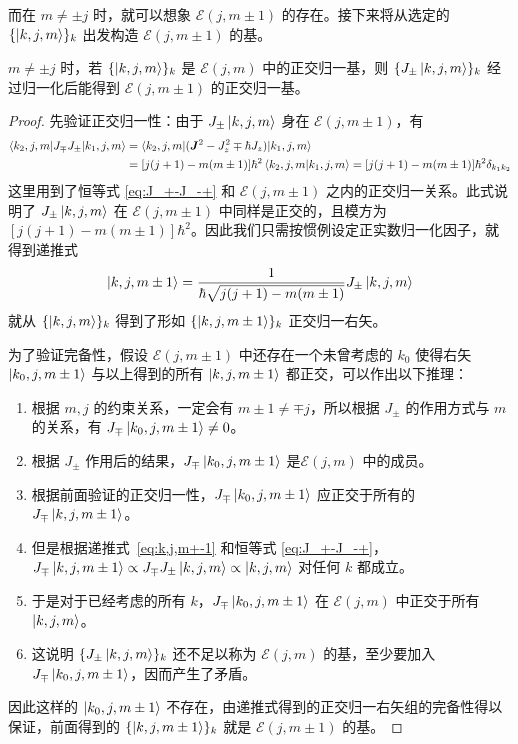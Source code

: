 \documentclass[cn,10pt,math=newtx,citestyle=gb7714-2015,bibstyle=gb7714-2015]{elegantbook}
\def\bm{\boldsymbol}
\def\ms{\mathscr}
\begin{document}
    而在 $m\ne \pm j$ 时，就可以想象 $\ms E(j,m\pm 1)$ 的存在。接下来将从选定的 $\{\ket{k,j,m}\}_k$ 出发构造 $\ms E(j,m\pm 1)$ 的基。
    
    \begin{theorem}[从 $\ms E(j,m)$ 的基构造 $\ms E(j,m\pm 1)$ 的基]
       $m\ne \pm j$ 时，若 $\{\ket{k,j,m}\}_k$ 是 $\ms E(j,m)$ 中的正交归一基，则 $\{J_\pm\ket{k,j,m}\}_k$ 经过归一化后能得到 $\ms E(j,m\pm 1)$ 的正交归一基。
    \end{theorem}
    \begin{proof}
    先验证正交归一性：由于 $J_\pm\ket{k,j,m}$ 身在 $\ms E(j,m\pm 1)$，有
    \begin{align}
        \braket{k_2,j,m|J_\mp J_\pm|k_1,j,m} &= \braket{k_2,j,m|(\bm J^2-J_z^2\mp \hbar J_z)|k_1,j,m}
        \\&=[j(j+1)-m(m\pm 1)]\hbar^2\braket{k_2,j,m|k_1,j,m}=[j(j+1)-m(m\pm 1)]\hbar^2\delta_{k_1k_2}
    \end{align}
    这里用到了恒等式 \ref{eq:J_+-J_-+} 和 $\ms E(j,m\pm 1)$ 之内的正交归一关系。此式说明了 $J_\pm\ket{k,j,m}$ 在 $\ms E(j,m\pm 1)$ 中同样是正交的，且模方为 $[j(j+1)-m(m\pm 1)]\hbar^2$。因此我们只需按惯例设定正实数归一化因子，就得到递推式
    \begin{equation}\label{eq:k,j,m+-1}
        \ket{k,j,m\pm1} = \frac{1}{\hbar\sqrt{j(j+1)-m(m\pm1)}}J_\pm\ket{k,j,m}
    \end{equation}
    就从 $\{\ket{k,j,m}\}_k$ 得到了形如 $\{\ket{k,j,m\pm1}\}_{k}$ 正交归一右矢。
    
    为了验证完备性，假设 $\ms E(j,m\pm 1)$ 中还存在一个未曾考虑的 $k_0$ 使得右矢 $\ket{k_0,j,m\pm1}$ 与以上得到的所有 $\ket{k,j,m\pm1}$ 都正交，可以作出以下推理：
    \begin{enumerate}
        \item 根据 $m,j$ 的约束关系，一定会有 $m\pm1\ne \mp j$，所以根据 $J_\pm$ 的作用方式与 $m$ 的关系，有 $J_\mp\ket{k_0,j,m\pm1}\ne 0$。
        \item 根据 $J_\pm$ 作用后的结果，$J_\mp\ket{k_0,j,m\pm1}$ 是$\ms E(j,m)$ 中的成员。
        \item 根据前面验证的正交归一性，$J_\mp\ket{k_0,j,m\pm1}$ 应正交于所有的 $J_\mp\ket{k,j,m\pm1}$。
        \item 但是根据递推式~\ref{eq:k,j,m+-1} 和恒等式 \ref{eq:J_+-J_-+}，$J_\mp\ket{k,j,m\pm1}\propto J_\mp J_\pm\ket{k,j,m}\propto\ket{k,j,m}$ 对任何 $k$ 都成立。
        \item 于是对于已经考虑的所有 $k$，$J_\mp\ket{k_0,j,m\pm1}$ 在 $\ms E(j,m)$ 中正交于所有 $\ket{k,j,m}$。
        \item 这说明 $\{J_\pm\ket{k,j,m}\}_k$ 还不足以称为 $\ms E(j,m)$ 的基，至少要加入 $J_\mp\ket{k_0,j,m\pm1}$，因而产生了矛盾。
    \end{enumerate}
    
    因此这样的 $\ket{k_0,j,m\pm1}$ 不存在，由递推式得到的正交归一右矢组的完备性得以保证，前面得到的 $\{\ket{k,j,m\pm1}\}_k$ 就是 $\ms E(j,m\pm 1)$ 的基。
        
    \end{proof}
    
\end{document}
